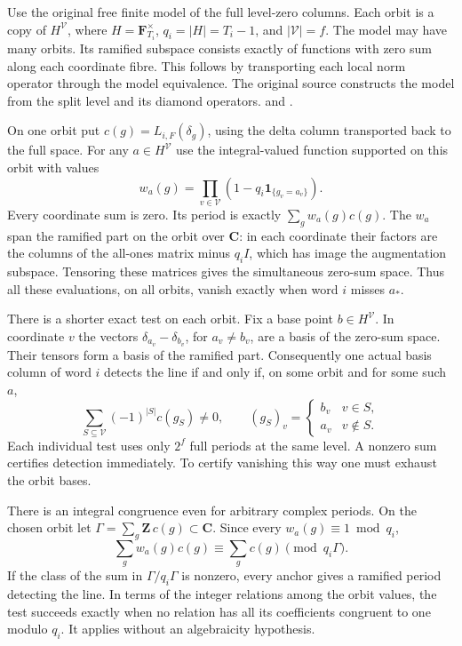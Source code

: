 Use the original free finite model of the full level-zero columns.
Each orbit is a copy of \(H^{\mathcal V}\), where
\(H=\mathbf F_{T_i}^{\times}\), \(q_i=|H|=T_i-1\), and
\(|\mathcal V|=f\). The model may have many orbits. Its ramified
subspace consists exactly of functions with zero sum along each
coordinate fibre. This follows by transporting each local norm
operator through the model equivalence. The original source
constructs the model from the split level and its diamond operators.
 and
.

On one orbit put \(c(g)=L_{i,F}(\delta_g)\), using the delta
column transported back to the full space. For any \(a\in H^{\mathcal V}\)
use the integral-valued function supported on this orbit with values
\[
       w_a(g)=\prod_{v\in\mathcal V}
          (1-q_i\mathbf1_{\{g_v=a_v\}}).
\]
Every coordinate sum is zero. Its period is exactly
\(\sum_g w_a(g)c(g)\). The \(w_a\) span the ramified part on the
orbit over \(\mathbf C\): in each coordinate their factors are the
columns of the all-ones matrix minus \(q_i I\), which has image the
augmentation subspace. Tensoring these matrices gives the simultaneous
zero-sum space. Thus all these evaluations, on all orbits, vanish
exactly when word \(i\) misses \(a_*\).

There is a shorter exact test on each orbit. Fix a base point
\(b\in H^{\mathcal V}\). In coordinate \(v\) the vectors
\(\delta_{a_v}-\delta_{b_v}\), for \(a_v\ne b_v\), are a basis of
the zero-sum space. Their tensors form a basis of the ramified part.
Consequently one actual basis column of word \(i\) detects the line
if and only if, on some orbit and for some such \(a\),
\[
   \sum_{S\subseteq\mathcal V}(-1)^{|S|}c(g_S)\ne0,
   \qquad (g_S)_v=
     \begin{cases} b_v&v\in S,\\ a_v&v\notin S.\end{cases}
\]
Each individual test uses only \(2^f\) full periods at the same
level. A nonzero sum certifies detection immediately. To certify
vanishing this way one must exhaust the orbit bases.

There is an integral congruence even for arbitrary complex periods.
On the chosen orbit let
\(\Gamma=\sum_g\mathbf Z\,c(g)\subset\mathbf C\).
Since every \(w_a(g)\equiv1\bmod q_i\),
\[
     \sum_g w_a(g)c(g)\equiv\sum_g c(g)\pmod{q_i\Gamma}.
\]
If the class of the sum in \(\Gamma/q_i\Gamma\) is nonzero,
every anchor gives a ramified period detecting the line. In terms
of the integer relations among the orbit values, the test succeeds
exactly when no relation has all its coefficients congruent to
one modulo \(q_i\). It applies without an algebraicity hypothesis.

